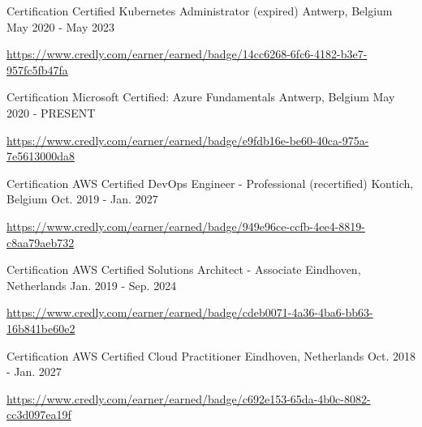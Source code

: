 \begin{cventries}
  \cventry
    {Certification} %
    {Certified Kubernetes Administrator (expired)} %
    {Antwerp, Belgium} %
    {May 2020 - May 2023} %
    {
      \begin{cvitems} %
        \item \url{https://www.credly.com/earner/earned/badge/14cc6268-6fc6-4182-b3e7-957fc5fb47fa}
      \end{cvitems}
    }

  \cventry
    {Certification} %
    {Microsoft Certified: Azure Fundamentals} %
    {Antwerp, Belgium} %
    {May 2020 - PRESENT} %
    {
      \begin{cvitems} %
        \item \url{https://www.credly.com/earner/earned/badge/e9fdb16e-be60-40ca-975a-7e5613000da8}
      \end{cvitems}
    }

  \cventry
    {Certification} %
    {AWS Certified DevOps Engineer - Professional (recertified)} %
    {Kontich, Belgium} %
    {Oct. 2019 - Jan. 2027} %
    {
      \begin{cvitems} %
        \item \url{https://www.credly.com/earner/earned/badge/949e96ce-ccfb-4ee4-8819-c8aa79aeb732}
      \end{cvitems}
    }

  \cventry
    {Certification} %
    {AWS Certified Solutions Architect - Associate} %
    {Eindhoven, Netherlands} %
    {Jan. 2019 - Sep. 2024} %
    {
      \begin{cvitems} %
        \item \url{https://www.credly.com/earner/earned/badge/cdeb0071-4a36-4ba6-bb63-16b841be60e2}
      \end{cvitems}
    }

  \cventry
    {Certification} %
    {AWS Certified Cloud Practitioner} %
    {Eindhoven, Netherlands} %
    {Oct. 2018 - Jan. 2027} %
    {
      \begin{cvitems} %
        \item \url{https://www.credly.com/earner/earned/badge/c692e153-65da-4b0c-8082-cc3d097ea19f}
      \end{cvitems}
    }


\end{cventries}
